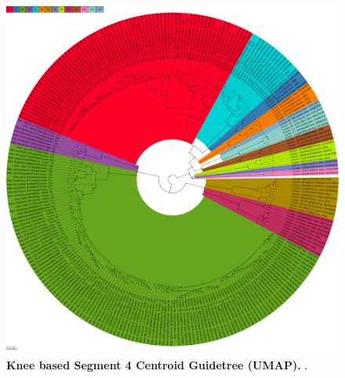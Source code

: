 \begin{figure}[!hbt]
    \includegraphics[width=\dimexpr\textwidth-2\fboxsep-2\fboxrule,fbox]{UMAP/Guidetree_segment_4_H_Centroid.pdf}
    \caption[Knee based Segment 4 Centroid Guidetree (\Acrshort{UMAP})]{\textbf{Knee based Segment 4 Centroid Guidetree (\Acrshort{UMAP}).} .}
    \label{fig:UMAP_Guidetree_Centroid_4}
\end{figure}

